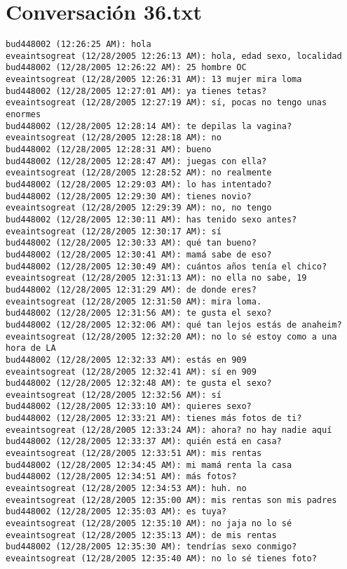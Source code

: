 \section{Conversaci\'on 36.txt}

\begin{verbatim}
bud448002 (12:26:25 AM): hola
eveaintsogreat (12/28/2005 12:26:13 AM): hola, edad sexo, localidad
bud448002 (12/28/2005 12:26:22 AM): 25 hombre OC
eveaintsogreat (12/28/2005 12:26:31 AM): 13 mujer mira loma
bud448002 (12/28/2005 12:27:01 AM): ya tienes tetas?
eveaintsogreat (12/28/2005 12:27:19 AM): sí, pocas no tengo unas enormes
bud448002 (12/28/2005 12:28:14 AM): te depilas la vagina?
eveaintsogreat (12/28/2005 12:28:18 AM): no
bud448002 (12/28/2005 12:28:31 AM): bueno
bud448002 (12/28/2005 12:28:47 AM): juegas con ella?
eveaintsogreat (12/28/2005 12:28:52 AM): no realmente
bud448002 (12/28/2005 12:29:03 AM): lo has intentado?
bud448002 (12/28/2005 12:29:30 AM): tienes novio?
eveaintsogreat (12/28/2005 12:29:39 AM): no, no tengo
bud448002 (12/28/2005 12:30:11 AM): has tenido sexo antes?
eveaintsogreat (12/28/2005 12:30:17 AM): sí
bud448002 (12/28/2005 12:30:33 AM): qué tan bueno?
bud448002 (12/28/2005 12:30:41 AM): mamá sabe de eso?
bud448002 (12/28/2005 12:30:49 AM): cuántos años tenía el chico?
eveaintsogreat (12/28/2005 12:31:13 AM): no ella no sabe, 19
bud448002 (12/28/2005 12:31:29 AM): de donde eres?
eveaintsogreat (12/28/2005 12:31:50 AM): mira loma.
bud448002 (12/28/2005 12:31:56 AM): te gusta el sexo?
bud448002 (12/28/2005 12:32:06 AM): qué tan lejos estás de anaheim?
eveaintsogreat (12/28/2005 12:32:20 AM): no lo sé estoy como a una hora de LA
bud448002 (12/28/2005 12:32:33 AM): estás en 909
eveaintsogreat (12/28/2005 12:32:41 AM): sí en 909
bud448002 (12/28/2005 12:32:48 AM): te gusta el sexo?
eveaintsogreat (12/28/2005 12:32:56 AM): sí
bud448002 (12/28/2005 12:33:10 AM): quieres sexo?
bud448002 (12/28/2005 12:33:21 AM): tienes más fotos de ti?
eveaintsogreat (12/28/2005 12:33:24 AM): ahora? no hay nadie aquí
bud448002 (12/28/2005 12:33:37 AM): quién está en casa?
eveaintsogreat (12/28/2005 12:33:51 AM): mis rentas
bud448002 (12/28/2005 12:34:45 AM): mi mamá renta la casa
bud448002 (12/28/2005 12:34:51 AM): más fotos?
eveaintsogreat (12/28/2005 12:34:53 AM): huh. no
eveaintsogreat (12/28/2005 12:35:00 AM): mis rentas son mis padres
bud448002 (12/28/2005 12:35:03 AM): es tuya?
eveaintsogreat (12/28/2005 12:35:10 AM): no jaja no lo sé
eveaintsogreat (12/28/2005 12:35:13 AM): de mis rentas
bud448002 (12/28/2005 12:35:30 AM): tendrías sexo conmigo?
eveaintsogreat (12/28/2005 12:35:40 AM): no lo sé tienes foto?

\end{verbatim}
